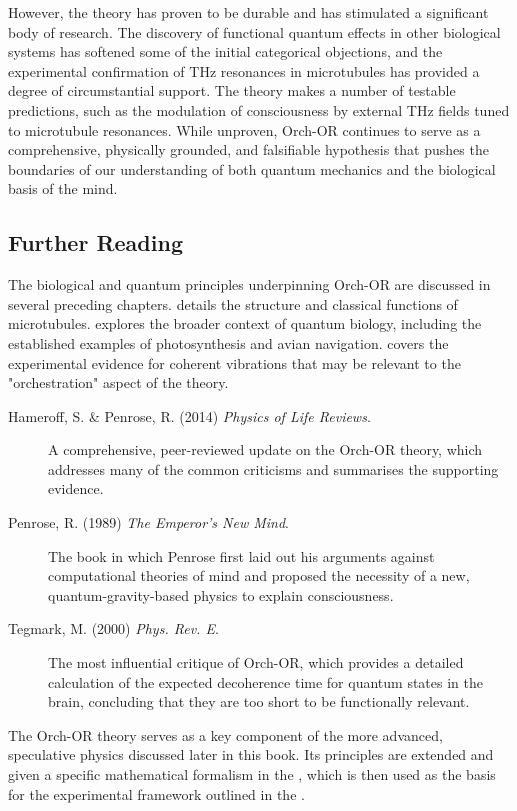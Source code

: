 However, the theory has proven to be durable and has stimulated a significant body of research. The discovery of functional quantum effects in other biological systems has softened some of the initial categorical objections, and the experimental confirmation of THz resonances in microtubules has provided a degree of circumstantial support. The theory makes a number of testable predictions, such as the modulation of consciousness by external THz fields tuned to microtubule resonances. While unproven, Orch-OR continues to serve as a comprehensive, physically grounded, and falsifiable hypothesis that pushes the boundaries of our understanding of both quantum mechanics and the biological basis of the mind.

\begin{importantbox}
\section*{Further Reading}
The biological and quantum principles underpinning Orch-OR are discussed in several preceding chapters.  details the structure and classical functions of microtubules.  explores the broader context of quantum biology, including the established examples of photosynthesis and avian navigation.  covers the experimental evidence for coherent vibrations that may be relevant to the "orchestration" aspect of the theory.

\begin{description}
    \item[Hameroff, S. \& Penrose, R. (2014) \textit{Physics of Life Reviews}.] A comprehensive, peer-reviewed update on the Orch-OR theory, which addresses many of the common criticisms and summarises the supporting evidence.
    \item[Penrose, R. (1989) \textit{The Emperor's New Mind}.] The book in which Penrose first laid out his arguments against computational theories of mind and proposed the necessity of a new, quantum-gravity-based physics to explain consciousness.
    \item[Tegmark, M. (2000) \textit{Phys. Rev. E}.] The most influential critique of Orch-OR, which provides a detailed calculation of the expected decoherence time for quantum states in the brain, concluding that they are too short to be functionally relevant.
\end{description}

The Orch-OR theory serves as a key component of the more advanced, speculative physics discussed later in this book. Its principles are extended and given a specific mathematical formalism in the , which is then used as the basis for the experimental framework outlined in the .
\end{importantbox}